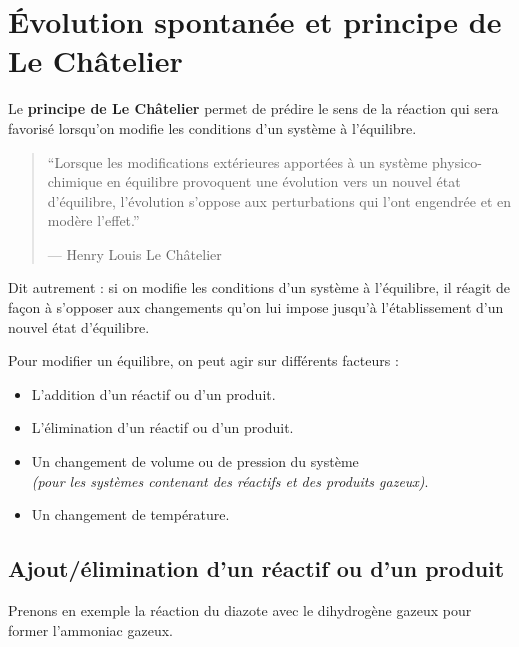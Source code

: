 \documentclass[
  11pt,
  a4paper,
  openany]{book}
\providecommand{\tightlist}{%
  \setlength{\itemsep}{0pt}\setlength{\parskip}{0pt}}
\begin{document}
\hypertarget{uxe9volution-spontanuxe9e-et-principe-de-le-chuxe2telier}{%
\section{Évolution spontanée et principe de Le Châtelier}\label{uxe9volution-spontanuxe9e-et-principe-de-le-chuxe2telier}}

Le \textbf{principe de Le Châtelier} permet de prédire le sens de la réaction qui sera favorisé lorsqu'on modifie les conditions d'un système à l'équilibre.

\begin{quote}
``Lorsque les modifications extérieures apportées à un système physico-chimique en équilibre provoquent une évolution vers un nouvel état d'équilibre, l'évolution s'oppose aux perturbations qui l'ont engendrée et en modère l'effet.''

--- Henry Louis Le Châtelier
\end{quote}

Dit autrement : si on modifie les conditions d'un système à l'équilibre, il réagit de façon à s'opposer aux changements qu'on lui impose jusqu'à l'établissement d'un nouvel état d'équilibre.

Pour modifier un équilibre, on peut agir sur différents facteurs :

\begin{itemize}
\tightlist
\item
  L'addition d'un réactif ou d'un produit.
\item
  L'élimination d'un réactif ou d'un produit.
\item
  Un changement de volume ou de pression du système\\
  \emph{(pour les systèmes contenant des réactifs et des produits gazeux)}.
\item
  Un changement de température.
\end{itemize}

\clearpage

\hypertarget{ajoutuxe9limination-dun-ruxe9actif-ou-dun-produit}{%
\subsection{Ajout/élimination d'un réactif ou d'un produit}\label{ajoutuxe9limination-dun-ruxe9actif-ou-dun-produit}}

Prenons en exemple la réaction du diazote avec le dihydrogène gazeux pour former l'ammoniac gazeux.
\end{document}

